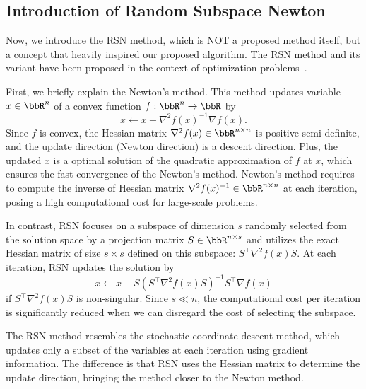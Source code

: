 \documentclass[dvipdfmx,lettersize,journal]{IEEEtran}
\begin{document}
\subsection{Introduction of Random Subspace Newton}\label{ssec:introRSN}

Now, we introduce the RSN method, which is NOT a proposed method itself, but a concept that heavily inspired our proposed algorithm.
The RSN method and its variant have been proposed in the context of optimization problems~\cite{NEURIPS2019_bc6dc48b,
  fujiRandomizedSubspaceRegularized2022,
  cartisRandomisedSubspaceMethods2022,
  nozawaRandomizedSubspaceGradient2023,
  higuchiFastConvergenceSecondOrder2024}.

First, we briefly explain the Newton's method.
This method updates variable $x \in \bbR^n$ of a convex function $f: \bbR^n \to \bbR$ by
\begin{equation*}
  x \gets x - \nabla^2 f(x)^{-1} \nabla f(x).
\end{equation*}
Since $f$ is convex, the Hessian matrix $\nabla^2 f(x) \in \bbR^{n \times n}$ is positive semi-definite, and the update direction (Newton direction) is a descent direction. Plus, the updated $x$ is a optimal solution of the quadratic approximation of $f$ at $x$, which ensures the fast convergence of the Newton's method.
Newton's method requires to compute the inverse of Hessian matrix $\nabla^2 f(x)^{-1} \in \bbR^{n \times n}$ at each iteration, posing a high computational cost for large-scale problems.

In contrast, RSN focuses on a subspace of dimension $s$ randomly selected from the solution space by a projection matrix $S \in \bbR^{n \times s}$ and utilizes the exact Hessian matrix of size $s \times s$ defined on this subspace: $S^\top \nabla^2 f(x) S$.
At each iteration, RSN updates the solution by
\begin{equation*}
  x \gets x - S (S^\top \nabla^2 f(x) S)^{-1} S^\top \nabla f(x)
\end{equation*}
if $S^\top \nabla^2 f(x) S$ is non-singular.
Since $s \ll n$, the computational cost per iteration is significantly reduced when we can disregard the cost of selecting the subspace.

The RSN method resembles the stochastic coordinate descent method, which updates only a subset of the variables at each iteration using gradient information.
The difference is that RSN uses the Hessian matrix to determine the update direction, bringing the method closer to the Newton method.
\end{document}
